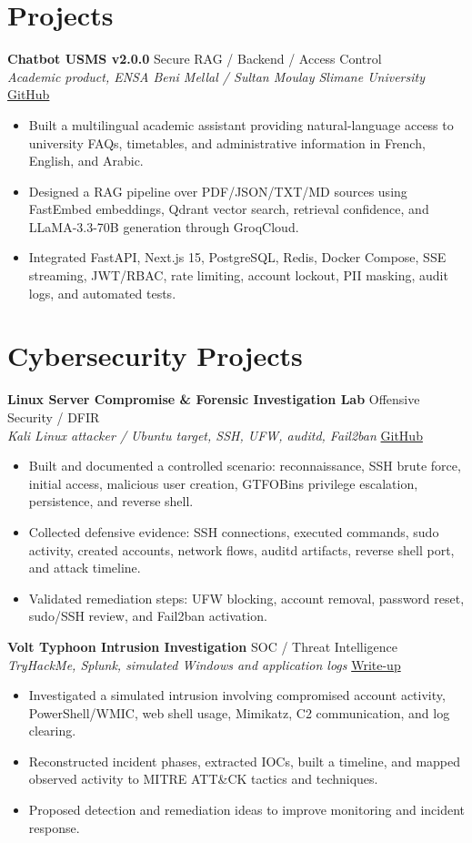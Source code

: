 \documentclass[10pt,a4paper]{article}
\newcommand{\project}[3]{\textbf{#1} \hfill #3\\\textit{#2}\vspace{1pt}}
\begin{document}
\section{Projects}
\project{Chatbot USMS v2.0.0}{Academic product, ENSA Beni Mellal / Sultan Moulay Slimane University}{Secure RAG / Backend / Access Control}
\href{https://github.com/ALLAKORI}{GitHub}
\begin{itemize}
  \item Built a multilingual academic assistant providing natural-language access to university FAQs, timetables, and administrative information in French, English, and Arabic.
  \item Designed a RAG pipeline over PDF/JSON/TXT/MD sources using FastEmbed embeddings, Qdrant vector search, retrieval confidence, and LLaMA-3.3-70B generation through GroqCloud.
  \item Integrated FastAPI, Next.js 15, PostgreSQL, Redis, Docker Compose, SSE streaming, JWT/RBAC, rate limiting, account lockout, PII masking, audit logs, and automated tests.
\end{itemize}

\section{Cybersecurity Projects}
\project{Linux Server Compromise \& Forensic Investigation Lab}{Kali Linux attacker / Ubuntu target, SSH, UFW, auditd, Fail2ban}{Offensive Security / DFIR}
\href{https://github.com/ALLAKORI/Linux-Server-Compromise-Forensic-Investigation-Lab}{GitHub}
\begin{itemize}
  \item Built and documented a controlled scenario: reconnaissance, SSH brute force, initial access, malicious user creation, GTFOBins privilege escalation, persistence, and reverse shell.
  \item Collected defensive evidence: SSH connections, executed commands, sudo activity, created accounts, network flows, auditd artifacts, reverse shell port, and attack timeline.
  \item Validated remediation steps: UFW blocking, account removal, password reset, sudo/SSH review, and Fail2ban activation.
\end{itemize}

\project{Volt Typhoon Intrusion Investigation}{TryHackMe, Splunk, simulated Windows and application logs}{SOC / Threat Intelligence}
\href{https://allakori.github.io/writeups/posts/volt-typhoon-intrusion/}{Write-up}
\begin{itemize}
  \item Investigated a simulated intrusion involving compromised account activity, PowerShell/WMIC, web shell usage, Mimikatz, C2 communication, and log clearing.
  \item Reconstructed incident phases, extracted IOCs, built a timeline, and mapped observed activity to MITRE ATT\&CK tactics and techniques.
  \item Proposed detection and remediation ideas to improve monitoring and incident response.
\end{itemize}
\end{document}
